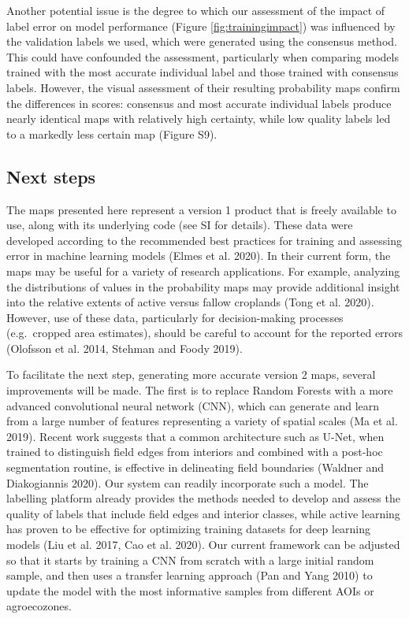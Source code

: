 \documentclass[11pt,a4paper]{article}
\begin{document}
Another potential issue is the degree to which our assessment of the
impact of label error on model performance (Figure
\ref{fig:trainingimpact}) was influenced by the validation labels we
used, which were generated using the consensus method. This could have
confounded the assessment, particularly when comparing models trained
with the most accurate individual label and those trained with consensus
labels. However, the visual assessment of their resulting probability
maps confirm the differences in scores: consensus and most accurate
individual labels produce nearly identical maps with relatively high
certainty, while low quality labels led to a markedly less certain map
(Figure S9).

\hypertarget{next-steps}{%
\subsection{Next steps}\label{next-steps}}

The maps presented here represent a version 1 product that is freely
available to use, along with its underlying code (see SI for details).
These data were developed according to the recommended best practices
for training and assessing error in machine learning models (Elmes et
al. 2020). In their current form, the maps may be useful for a variety
of research applications. For example, analyzing the distributions of
values in the probability maps may provide additional insight into the
relative extents of active versus fallow croplands (Tong et al. 2020).
However, use of these data, particularly for decision-making processes
(e.g.~cropped area estimates), should be careful to account for the
reported errors (Olofsson et al. 2014, Stehman and Foody 2019).

To facilitate the next step, generating more accurate version 2 maps,
several improvements will be made. The first is to replace Random
Forests with a more advanced convolutional neural network (CNN), which
can generate and learn from a large number of features representing a
variety of spatial scales (Ma et al. 2019). Recent work suggests that a
common architecture such as U-Net, when trained to distinguish field
edges from interiors and combined with a post-hoc segmentation routine,
is effective in delineating field boundaries (Waldner and Diakogiannis
2020). Our system can readily incorporate such a model. The labelling
platform already provides the methods needed to develop and assess the
quality of labels that include field edges and interior classes, while
active learning has proven to be effective for optimizing training
datasets for deep learning models (Liu et al. 2017, Cao et al. 2020).
Our current framework can be adjusted so that it starts by training a
CNN from scratch with a large initial random sample, and then uses a
transfer learning approach (Pan and Yang 2010) to update the model with
the most informative samples from different AOIs or agroecozones.
\end{document}
